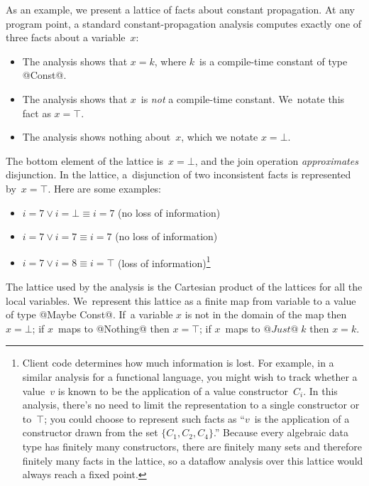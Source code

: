 \documentclass[blockstyle,preprint,natbib,nocopyrightspace]{sigplanconf}
\begin{document}
As an example, 
we present a lattice of facts about constant propagation.
At any program point, a standard constant-propagation analysis
computes exactly one of three
facts about a variable~$x$:
\begin{itemize}
\item
The analysis shows that
$x = k$, where $k$~is a compile-time constant of type @Const@.
\item
The analysis shows that $x$~is \emph{not} a compile-time constant.
We~notate this fact as $x = \top$.
\item
The analysis shows nothing about~$x$, which we notate $x=\bot$.
\end{itemize}
The bottom element of the lattice is~$x=\bot$, and
the join operation \emph{approximates} disjunction.
In the lattice, a~disjunction of two inconsistent facts is represented by~$x=\top$.
Here are some examples:
\begin{itemize}
\item
$i = 7 \lor i=\bot \equiv i=7$ (no loss of information)
\item
$i = 7 \lor i= 7 \equiv  i=7$ (no loss of information)
\item
$i = 7 \lor i = 8 \equiv i = \top$ (loss of information)\footnote
{Client code determines how much information is lost.
For example, in a similar analysis for a functional language,
you might wish to track whether a value~$v$ is known to
be the application of a value constructor~$C_i$.
In this analysis, there's no need to limit the representation to a
single constructor or to~$\top$;
you could choose to represent such facts as ``$v$~is
the application of a constructor drawn from the set $\{C_1, C_2,
C_4\}$.''
Because every algebraic data type has finitely many constructors,
there are finitely many sets and therefore finitely many facts in the
lattice, so a dataflow analysis over this lattice would always reach a
fixed point.
}

\end{itemize}

The lattice  used by the analysis is the Cartesian product of the
lattices for all the local variables.
We~represent this lattice as a finite map from variable
to a value of type @Maybe Const@.
If~a variable $x$ is not in the domain of the map then $x=\bot$;
if $x$~maps to @Nothing@ then $x=\top$; if $x$~maps to $@Just@\;k$ then
$x=k$.
\end{document}
